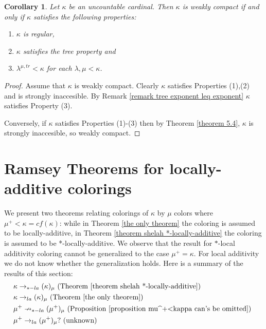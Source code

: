 \documentclass[11pt]{amsart}
\theoremstyle{plain}
\newtheorem{corollary}[theorem]{Corollary}
\newtheorem{question}[theorem]{Question}
\theoremstyle{definition} %
\theoremstyle{remark}
\newcommand{\be}{\begin{enumerate}}
\newcommand{\ee}{\end{enumerate}}
\begin{document}



\begin{corollary}
Let $\kappa$ be an uncountable cardinal. Then $\kappa$ is weakly compact if and only if $\kappa$ satisfies the following properties:
\be
\item $\kappa$ is regular,
\item $\kappa$ satisfies the tree property and
\item $\lambda^{\mu,tr}<\kappa$ for each $\lambda,\mu<\kappa$.
\ee
\end{corollary}

\begin{proof}
Assume that $\kappa$ is weakly compact. Clearly $\kappa$ satisfies Properties (1),(2) and is strongly inaccesible. By Remark \ref{remark tree exponent leq exponent} $\kappa$ satisfies Property (3).

Conversely, if $\kappa$ satisfies Properties (1)-(3) then by Theorem \ref{theorem 5.4}, $\kappa$ is strongly inaccesible, so weakly compact.
\end{proof}

















\section{Ramsey Theorems for locally-additive colorings}

We present two theorems relating colorings of $\kappa$ by $\mu$ colors where $\mu^+<\kappa=cf(\kappa)$: while in Theorem \ref{the only theorem} the coloring is assumed to be locally-additive, in Theorem \ref{theorem shelah *-locally-additive} the coloring is assumed to be *-locally-additive. We observe that the result for $*$-local additivity coloring cannot be generalized to the case $\mu^+=\kappa$. For local additivity we do not know whether the generalization holds. Here is a summary of the results of this section:
\begin{align*}
&\kappa \rightarrow_{*-la} (\kappa)_\mu \text{ (Theorem \ref{theorem shelah *-locally-additive}) }\\
&\kappa \rightarrow_{la} (\kappa)_\mu \text{ (Theorem \ref{the only theorem}) } \\
&\mu^+ \nrightarrow_{*-la} (\mu^+)_\mu  \text{ (Proposition \ref{proposition mu^+<kappa can's be omitted})  }            \\
&\mu^+ \rightarrow_{la} (\mu^+)_\mu? \text{ (unknown) }
\end{align*}
\end{document}
